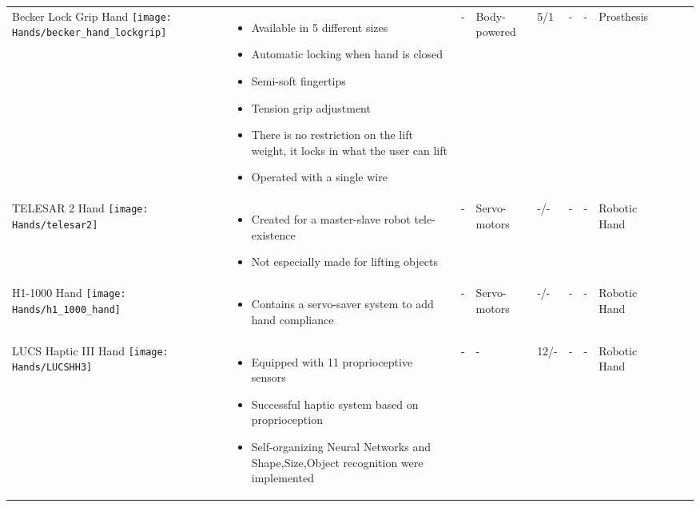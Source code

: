 \documentclass[main]{subfiles}
\begin{document}
\begin{longtable}{@{}p{6cm}p{4cm}p{0.7cm}p{1.2cm}p{1cm}p{1cm}p{1cm}p{1cm}p{1cm}p{1cm}p{2cm}@{}}
Becker Lock Grip Hand \newline
\texttt{[image: Hands/becker\_hand\_lockgrip]}& 
\begin{itemize}\itemsep0em
\item Available in 5 different sizes
\item Automatic locking when hand is closed
\item Semi-soft fingertips
\item Tension grip adjustment
\item There is no restriction on the lift weight, it locks in what the user can lift
\item Operated with a single wire
\end{itemize} 
& - & Body-powered & 5/1 & - & -  & Prosthesis\\

TELESAR 2 Hand \newline
\texttt{[image: Hands/telesar2]}& 
\begin{itemize}\itemsep0em
\item Created for a master-slave robot tele-existence
\item Not especially made for lifting objects
\end{itemize} 
& - & Servo-motors & -/- & - & -  & Robotic Hand\\

H1-1000 Hand \newline
\texttt{[image: Hands/h1\_1000\_hand]}& 
\begin{itemize}\itemsep0em
\item Contains a servo-saver system to add hand compliance
\end{itemize} 
& - & Servo-motors & -/- & - & -  & Robotic Hand\\

LUCS Haptic III Hand \newline
\texttt{[image: Hands/LUCSHH3]}& 
\begin{itemize}\itemsep0em
\item Equipped with 11 proprioceptive sensors
\item Successful haptic system based on proprioception
\item Self-organizing Neural Networks and Shape,Size,Object recognition were implemented
\end{itemize} 
& - & - & 12/- & - & - & Robotic Hand\\


\end{longtable}
\end{document}
